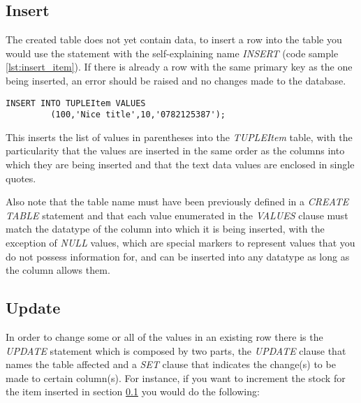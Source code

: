 \subsection{Insert}
\label{sec:sql_insert}

The created table does not yet contain data, to insert a row into the table you would use the statement with the self-explaining name \emph{INSERT} (code sample \ref{lst:insert_item}). If there is already a row with the same primary key as the one being inserted, an error should be raised and no changes made to the database. 

\lstset{
  language=SQL, 
  caption=SQL insert statement, 
  label=lst:insert_item,
}


\begin{shaded}
\begin{lstlisting}
INSERT INTO TUPLEItem VALUES 
         (100,'Nice title',10,'0782125387');
\end{lstlisting}  
\end{shaded}

This inserts the list of values in parentheses into the \emph{TUPLEItem} table, with the particularity that the values are inserted in the same order as the columns into which they are being inserted and that the text data values are enclosed in single quotes. 

Also note that the table name must have been previously defined in a \emph{CREATE TABLE} statement and that each value enumerated in the \emph{VALUES} clause must match the datatype of the column into which it is being inserted, with the exception of \emph{NULL} values, which are special markers to represent values that you do not possess information for, and can be inserted into any datatype as long as the column allows them.

\subsection{Update}
In order to change some or all of the values in an existing row there is the \emph{UPDATE} statement which is composed by two parts, the \emph{UPDATE} clause that names the table affected and a \emph{SET} clause that indicates the change(s) to be made to certain column(s). For instance, if you want to increment the stock for the item inserted in section \ref{sec:sql_insert} you would do the following:

\lstset{
  language=SQL, 
  caption=SQL update statement, 
  label=lst:update_item,
}


